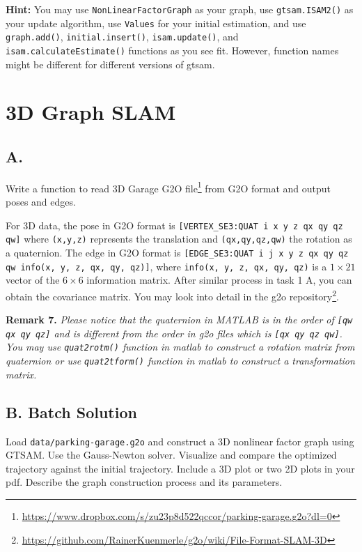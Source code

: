 \documentclass[tp]{lcc}
\begin{document}
\textbf{Hint:} You may use \lstinline[style=bash]{NonLinearFactorGraph} as your graph, use \lstinline[style=bash]{gtsam.ISAM2()} as your update algorithm, use \lstinline[style=bash]{Values} for your initial estimation, and use \lstinline[style=bash]{graph.add()}, \lstinline[style=bash]{initial.insert()}, \lstinline[style=bash]{isam.update()}, and \lstinline[style=bash]{isam.calculateEstimate()} functions as you see fit. However, function names might be different for different versions of gtsam.

\section{3D Graph SLAM}
\subsection{A.}
Write a function to read 3D Garage G2O file\footnote{\url{https://www.dropbox.com/s/zu23p8d522qccor/parking-garage.g2o?dl=0}} from G2O format and output poses and edges.

For 3D data, the pose in G2O format is \lstinline[style=bash]{[VERTEX_SE3:QUAT i x y z qx qy qz qw]} where \lstinline[style=bash]{(x,y,z)} represents the translation and \lstinline[style=bash]{(qx,qy,qz,qw)} the rotation as a quaternion. The edge in G2O format is \lstinline[style=bash]{[EDGE_SE3:QUAT i j x y z qx qy qz qw info(x, y, z, qx, qy, qz)]}, where \lstinline[style=bash]{info(x, y, z, qx, qy, qz)} is a $1 \times 21$ vector of the $6 \times 6$ information matrix. After similar process in task 1 A, you can obtain the covariance matrix. You may look into detail in the g2o repository\footnote{\url{https://github.com/RainerKuenmerle/g2o/wiki/File-Format-SLAM-3D}}.

\textbf{Remark 7.} \textit{Please notice that the quaternion in MATLAB is in the order of \lstinline[style=bash]{[qw qx qy qz]} and is different from the order in g2o files which is \lstinline[style=bash]{[qx qy qz qw]}. You may use \lstinline[style=bash]{quat2rotm()} function in matlab to construct a rotation matrix from quaternion or use \lstinline[style=bash]{quat2tform()} function in matlab to construct a transformation matrix.}

\subsection{B. Batch Solution}
Load \lstinline[style=bash]{data/parking-garage.g2o} and construct a 3D nonlinear factor graph using GTSAM. Use the Gauss-Newton solver. Visualize and compare the optimized trajectory against the initial trajectory. Include a 3D plot or two 2D plots in your pdf. Describe the graph construction process and its parameters.
\end{document}
